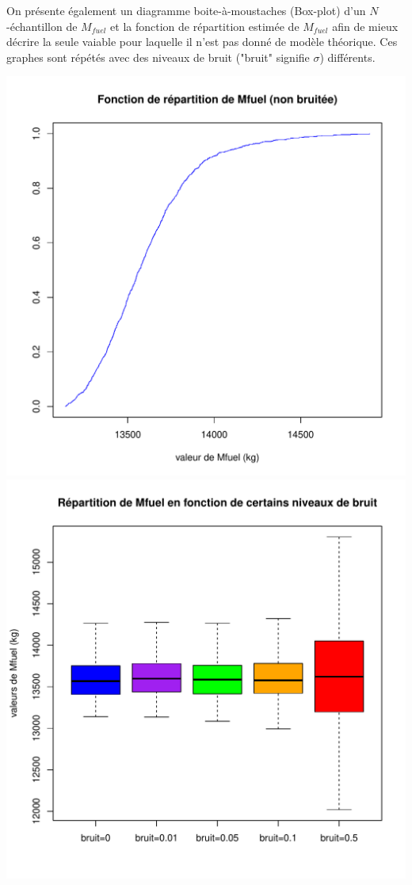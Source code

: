 \documentclass{book}
\begin{document}
\medbreak
On présente également un diagramme boite-à-moustaches (Box-plot) d'un $N$-échantillon de $M_{fuel}$ et la fonction de répartition estimée de $M_{fuel}$ afin de mieux décrire la seule vaiable pour laquelle il n'est pas donné de modèle théorique. Ces graphes sont répétés avec des niveaux de bruit ("bruit" signifie $\sigma$) différents. 
\begin{center}
\includegraphics[scale=0.7]{M_fctrep.pdf}
\includegraphics[scale=0.7]{boxplot.pdf}

\end{center}
\end{document}
